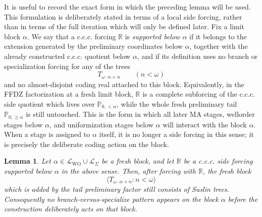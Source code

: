 \documentclass[11pt]{article}
\theoremstyle{plain}
\newtheorem{lemma}[theorem]{Lemma}
\theoremstyle{definition}
\theoremstyle{remark}
\newcommand{\Pp}{\mathbb P}
\begin{document}
It is useful to record the exact form in which the preceding lemma will be used.
This formulation is deliberately stated in terms of a local side forcing, rather
than in terms of the full iteration which will only be defined later.  Fix a
limit block \(\alpha\).  We say that a c.c.c. forcing \(\mathbb R\) is
\emph{supported below \(\alpha\)} if it belongs to the extension generated by the
preliminary coordinates below \(\alpha\), together with the already constructed
c.c.c. quotient below \(\alpha\), and if its definition uses no branch or
specialization forcing for any of the trees
\[
   T_{\omega\cdot\alpha+n}\qquad(n<\omega)
\]
and no almost-disjoint coding real attached to this block.  Equivalently, in the
FFDZ factorization at a fresh limit block, \(\mathbb R\) is a complete subforcing
of the c.c.c. side quotient which lives over
\(\Pp_{0,<\alpha}\), while the whole fresh preliminary tail
\(\Pp_{0,\geq\alpha}\) is still untouched.  This is the form in which all later
MA stages, wellorder stages below \(\alpha\), and uniformization stages below
\(\alpha\) will interact with the block \(\alpha\).  When a stage is assigned to
\(\alpha\) itself, it is no longer a side forcing in this sense; it is precisely
the deliberate coding action on the block.

\begin{lemma}\label{lem:no-accidental-codes}
Let \(\alpha\in\mathcal L_{\mathrm{WO}}\cup\mathcal L_\Sigma\) be a fresh block,
and let \(\mathbb R\) be a c.c.c. side forcing supported below \(\alpha\) in the
above sense.  Then, after forcing with \(\mathbb R\), the fresh block
\[
   \langle T_{\omega\cdot\alpha+n}:n<\omega\rangle
\]
which is added by the tail preliminary factor still consists of Suslin trees.
Consequently no branch-versus-specialize pattern appears on the block
\(\alpha\) before the construction deliberately acts on that block.
\end{lemma}
\end{document}
